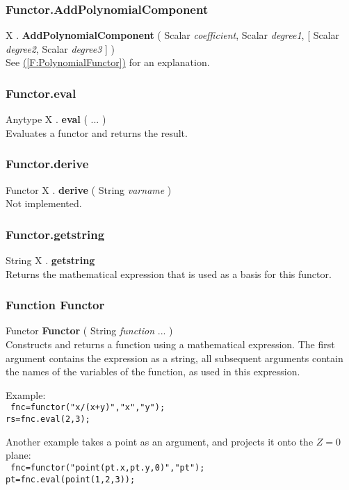 \documentclass[10pt]{book}
\newcommand{\linkitem}[1]{\hyperref[#1]{\nameref{#1} (\ref{#1})}}
\newcommand{\sourcecode}[1]{\texttt{#1}}
\begin{document}
\subsubsection{Functor.AddPolynomialComponent \label{F:Functor:AddPolynomialComponent}}
X . \textbf{AddPolynomialComponent} ( Scalar \textit{coefficient}, Scalar \textit{degree1},  [ Scalar \textit{degree2}, Scalar \textit{degree3} ] ) \\
See \linkitem{F:PolynomialFunctor} for an explanation.

\subsubsection{Functor.eval \label{F:Functor:eval}}
Anytype X . \textbf{eval} (  ...  ) \\
Evaluates a functor and returns the result.

\subsubsection{Functor.derive \label{F:Functor:derive}}
Functor X . \textbf{derive} ( String \textit{varname} ) \\
Not implemented.

\subsubsection{Functor.getstring \label{F:Functor:getstring}}
String X . \textbf{getstring} \\
Returns the mathematical expression that is used as a basis for this functor.

\subsubsection{Function Functor \label{F:Functor}}
Functor \textbf{Functor} ( String \textit{function} ...  ) \\
Constructs and returns a function using a mathematical expression. The first argument contains the expression as a string, all subsequent arguments contain the names of the variables of the function, as used in this expression.

Example: \\
\sourcecode{
fnc=functor("x/(x+y)","x","y"); \\
rs=fnc.eval(2,3); \\
}

Another example takes a point as an argument, and projects it onto the $Z=0$ plane: \\
\sourcecode{
fnc=functor("point(pt.x,pt.y,0)","pt"); \\
pt=fnc.eval(point(1,2,3)); \\
}
\end{document}
